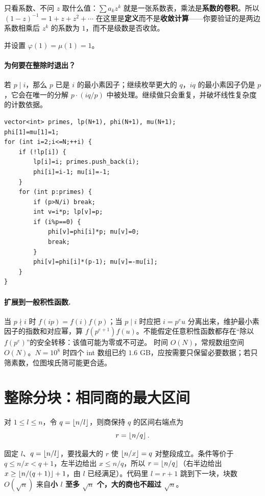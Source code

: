 \begin{tip}
只看系数、不问 $z$ 取什么值：$\sum a_kz^k$ 就是一张系数表，乘法是\textbf{系数的卷积}。所以 $(1-z)^{-1}=1+z+z^2+\cdots$ 在这里是\textbf{定义}而不是\textbf{收敛计算}——你要验证的是两边系数相乘后 $z^k$ 的系数为 $1$，而不是级数是否收敛。
\end{tip}

并设置 $\varphi(1)=\mu(1)=1$。


\paragraph{为何要在整除时退出？}
若 $p\mid i$，那么 $p$ 已是 $i$ 的最小素因子；继续枚举更大的 $q$，$iq$ 的最小素因子仍是 $p$，它会在唯一的分解 $p\cdot(iq/p)$ 中被处理。继续做只会重复，并破坏线性复杂度的计数依据。
\begin{lstlisting}
vector<int> primes, lp(N+1), phi(N+1), mu(N+1);
phi[1]=mu[1]=1;
for (int i=2;i<=N;++i) {
    if (!lp[i]) {
        lp[i]=i; primes.push_back(i);
        phi[i]=i-1; mu[i]=-1;
    }
    for (int p:primes) {
        if (p>N/i) break;
        int v=i*p; lp[v]=p;
        if (i%p==0) {
            phi[v]=phi[i]*p; mu[v]=0;
            break;
        }
        phi[v]=phi[i]*(p-1); mu[v]=-mu[i];
    }
}
\end{lstlisting}
\paragraph{扩展到一般积性函数.} 当 $p\nmid i$ 时 $f(ip)=f(i)f(p)$；当 $p\mid i$ 时应把 $i=p^e u$ 分离出来，维护最小素因子的指数和对应幂，算 $f(p^{e+1})f(u)$。不能假定任意积性函数都存在“除以 $f(p^e)$”的安全转移：该值可能为零或不可逆。
\cost 时间 $O(N)$，常规数组空间 $O(N)$。$N=10^8$ 时四个 int 数组已约 $1.6$ GB，应按需要只保留必要数据；若只筛素数，位图埃氏筛可能更合适。


\section{整除分块：相同商的最大区间}
对 $1\le l\le n$，令 $q=\left\lfloor n/l\right\rfloor$，则商保持 $q$ 的区间右端点为
\[
 r=\left\lfloor n/q\right\rfloor.
\]

\begin{tip}[$r=\floor{n/q}$ 是怎么想到的]
固定 $l$、$q=\left\lfloor n/l\right\rfloor$，要找最大的 $r$ 使 $\left\lfloor n/x\right\rfloor=q$ 对整段成立。条件等价于 $q\le n/x<q+1$，左半边给出 $x\le n/q$，所以 $r=\floor{n/q}$（右半边给出 $x\ge\left\lfloor n/(q+1)\right\rfloor+1$，由 $l$ 已经满足）。代码里 $l=r+1$ 跳到下一块，块数 $O(\sqrt n)$ 来自\textbf{小 $l$ 至多 $\sqrt n$ 个，大的商也不超过 $\sqrt n$}。
\end{tip}


